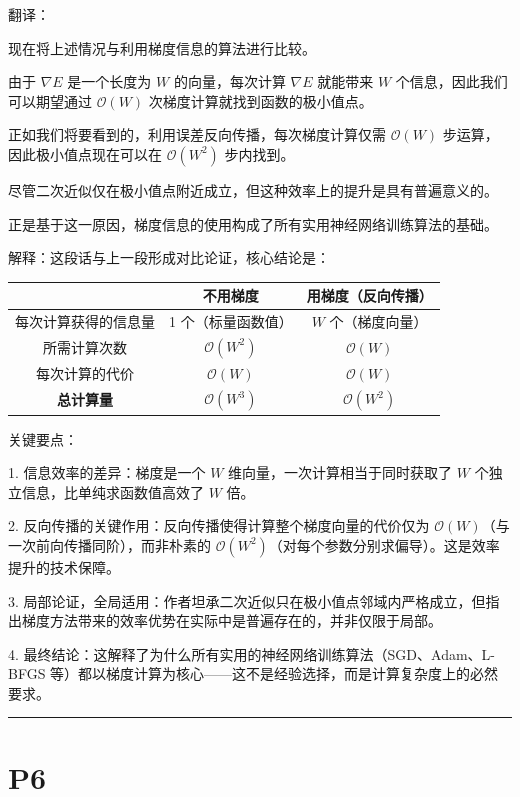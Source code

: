 \documentclass{article}
\begin{document}
{\color{red}
翻译：

现在将上述情况与利用梯度信息的算法进行比较。

由于 $\nabla E$ 是一个长度为 $W$ 的向量，每次计算 $\nabla E$ 就能带来 $W$ 个信息，因此我们可以期望通过 $\mathcal{O}(W)$ 次梯度计算就找到函数的极小值点。

正如我们将要看到的，利用误差反向传播，每次梯度计算仅需 $\mathcal{O}(W)$ 步运算，因此极小值点现在可以在 $\mathcal{O}(W^2)$ 步内找到。

尽管二次近似仅在极小值点附近成立，但这种效率上的提升是具有普遍意义的。

正是基于这一原因，梯度信息的使用构成了所有实用神经网络训练算法的基础。
}

{\color{blue}
解释：这段话与上一段形成对比论证，核心结论是：
\begin{table}[htbp]
\centering
\renewcommand{\arraystretch}{1.5}   %
\color{blue}
\begin{tabular}{|c|c|c|}\hline 
 & 不用梯度 & 用梯度（反向传播） \\ \hline 
每次计算获得的信息量 & 1 个（标量函数值） & $W$ 个（梯度向量） \\ \hline 
所需计算次数 & $\mathcal{O}(W^2)$ & $\mathcal{O}(W)$ \\ \hline 
每次计算的代价 & $\mathcal{O}(W)$ & $\mathcal{O}(W)$ \\ \hline 
\textbf{总计算量} & $\mathcal{O}(W^3)$ & $\mathcal{O}(W^2)$ \\ \hline 
\end{tabular}
\end{table}

关键要点：

1. 信息效率的差异：梯度是一个 $W$ 维向量，一次计算相当于同时获取了 $W$ 个独立信息，比单纯求函数值高效了 $W$ 倍。

2. 反向传播的关键作用：反向传播使得计算整个梯度向量的代价仅为 $\mathcal{O}(W)$（与一次前向传播同阶），而非朴素的 $\mathcal{O}(W^2)$（对每个参数分别求偏导）。这是效率提升的技术保障。

3. 局部论证，全局适用：作者坦承二次近似只在极小值点邻域内严格成立，但指出梯度方法带来的效率优势在实际中是普遍存在的，并非仅限于局部。

4. 最终结论：这解释了为什么所有实用的神经网络训练算法（SGD、Adam、L-BFGS 等）都以梯度计算为核心——这不是经验选择，而是计算复杂度上的必然要求。
}


\noindent\rule{\linewidth}{0.4pt}

\section{P6} %
\end{document}
